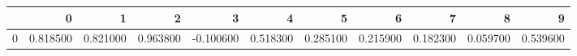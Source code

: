\begin{tabular}{lrrrrrrrrrr}
\toprule
 & 0 & 1 & 2 & 3 & 4 & 5 & 6 & 7 & 8 & 9 \\
\midrule
0 & 0.818500 & 0.821000 & 0.963800 & -0.100600 & 0.518300 & 0.285100 & 0.215900 & 0.182300 & 0.059700 & 0.539600 \\
\bottomrule
\end{tabular}
